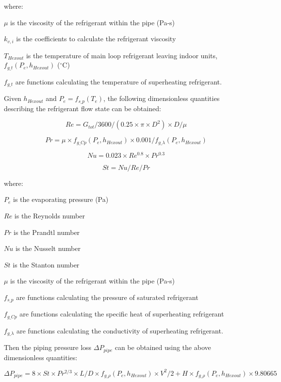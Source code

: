 where:

$\mu$ is the viscosity of the refrigerant within the pipe (Pa-s)

$k_{v,i}$ is the coefficients to calculate the refrigerant viscosity

$T_{Hexout}$ is the temperature of main loop refrigerant leaving indoor units, $f_{g\_t}(P_e,h_{Hexout})$ (\(^{\circ}\)C)

$f_{g\_t}$ are functions calculating the temperature of superheating refrigerant.

Given $h_{Hexout}$ and $P_e=f_{s\_p}(T_e)$, the following dimensionless quantities describing the refrigerant flow state can be obtained:

\begin{equation}
  Re=G_{tot}/3600/(0.25\times\pi\times{D^2})\times{D}/\mu
\end{equation}

\begin{equation}
  Pr=\mu\times{f_{g\_Cp}(P_e,h_{Hexout})}\times{0.001}/f_{g\_\lambda}(P_e,h_{Hexout})
\end{equation}

\begin{equation}
  Nu=0.023\times{Re^{0.8}\times{Pr^{0.3}}}
\end{equation}

\begin{equation}
  St=Nu/Re/Pr
\end{equation}

where:

$P_e$ is the evaporating pressure (Pa)

$Re$ is the Reynolds number

$Pr$ is the Prandtl number

$Nu$ is the Nusselt number

$St$ is the Stanton number

$\mu$ is the viscosity of the refrigerant within the pipe (Pa-s)

$f_{s\_p}$ are functions calculating the pressure of saturated refrigerant

$f_{g\_Cp}$ are functions calculating the specific heat of superheating refrigerant

$f_{g\_\lambda}$ are functions calculating the conductivity of superheating refrigerant.

Then the piping pressure loss $\Delta{P_{pipe}}$ can be obtained using the above dimensionless quantities:

\begin{equation}
  \Delta{P_{pipe}}=8\times{St}\times{Pr^{2/3}}\times{L/D}\times{f_{g\_\rho}(P_e,h_{Hexout})}\times{V^2}/2+H\times{f_{g\_\rho}(P_e,h_{Hexout})}\times9.80665
\end{equation}

